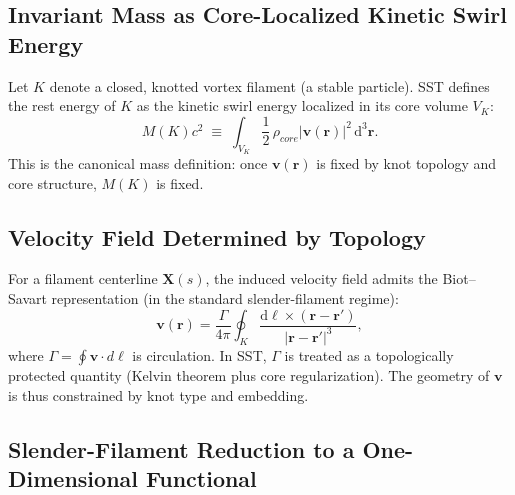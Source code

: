 \documentclass[10pt]{article}
\newcommand{\rhocore}{\rho_{core}}
\begin{document}
    \subsection{Invariant Mass as Core-Localized Kinetic Swirl Energy}

        Let $K$ denote a closed, knotted vortex filament (a stable particle). SST defines
        the rest energy of $K$ as the kinetic swirl energy localized in its core volume
        $V_K$:
        \begin{equation}
            M(K)c^2
            \;\equiv\;
            \int_{V_K}
            \frac{1}{2}\,\rhocore
            \left|\mathbf{v}(\mathbf{r})\right|^2
            \,\mathrm{d}^3\mathbf{r}.
            \label{eq:mass_def_exact}
        \end{equation}
        This is the canonical mass definition: once $\mathbf{v}(\mathbf{r})$ is fixed by
        knot topology and core structure, $M(K)$ is fixed.

    \subsection{Velocity Field Determined by Topology}

        For a filament centerline $\mathbf{X}(s)$, the induced velocity field admits the
        Biot--Savart representation (in the standard slender-filament regime):
        \begin{equation}
            \mathbf{v}(\mathbf{r})
            =
            \frac{\Gamma}{4\pi}\oint_K
            \frac{\mathrm{d}\boldsymbol{\ell}\times(\mathbf{r}-\mathbf{r}')}{|\mathbf{r}-\mathbf{r}'|^3},
        \end{equation}
        where $\Gamma=\oint\mathbf{v}\cdot d\boldsymbol{\ell}$ is circulation. In SST,
        $\Gamma$ is treated as a topologically protected quantity (Kelvin theorem plus
        core regularization). The geometry of $\mathbf{v}$ is thus constrained by knot
        type and embedding.

    \subsection{Slender-Filament Reduction to a One-Dimensional Functional}
\end{document}
